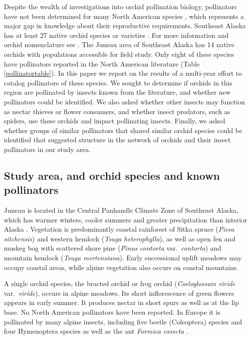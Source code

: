 \begin{multicols}{2}
Despite the wealth of investigations into orchid pollination biology,
pollinators have not been determined for many North American species
\citep{Argue2012a, Argue2012b}, which represents a major gap in knowledge about their
reproductive requirements. Southeast Alaska has at least 27 native
orchid species or varieties \citep[e.g.,][]{Hulten1968, Brown2006}. For more
information and orchid nomenclature see \citet{BowlesArmstrong2019}. The
Juneau area of Southeast Alaska has 14 native orchids with populations
accessible for field study. Only eight of these species have pollinators
reported in the North American literature (Table \ref{pollinatortable}). In this paper we
report on the results of a multi-year effort to catalog pollinators of
these species. We sought to determine if orchids in this region are
pollinated by insects known from the literature, and whether new
pollinators could be identified. We also asked whether other insects may
function as nectar thieves or flower consumers, and whether insect
predators, such as spiders, use these orchids and impact pollinating
insects. Finally, we asked whether groups of similar pollinators that
shared similar orchid species could be identified that suggested
structure in the network of orchids and their insect pollinators in our
study area.

\subsection{Study area, and orchid species and known pollinators}

Juneau is located in the Central Panhandle Climate Zone of Southeast
Alaska, which has warmer winters, cooler summers and greater
precipitation than interior Alaska \citep{Bienieketal2012}. Vegetation is
predominantly coastal rainforest of Sitka spruce (\emph{Picea
sitchensis}) and western hemlock (\emph{Tsuga heterophylla}), as well as
open fen and muskeg bog with scattered shore pine (\emph{Pinus contorta}
var.\ \emph{contorta}) and mountain hemlock (\emph{Tsuga mertensiana}).
Early successional uplift meadows may occupy coastal areas, while alpine
vegetation also occurs on coastal mountains.

A single orchid species, the bracted orchid or frog orchid
(\emph{Coeloglossum viride} var.\ \emph{viride}), occurs in alpine
meadows. Its short inflorescence of green flowers appears in early
summer. It produces nectar in short spurs as well as at the lip base. No
North American pollinators have been reported. In Europe it is
pollinated by many alpine insects, including five beetle (Coleoptera)
species and four Hymenoptera species as well as the ant \emph{Formica
exsecta} \citep{ClaessensSeiffert2017}.

\end{multicols}
